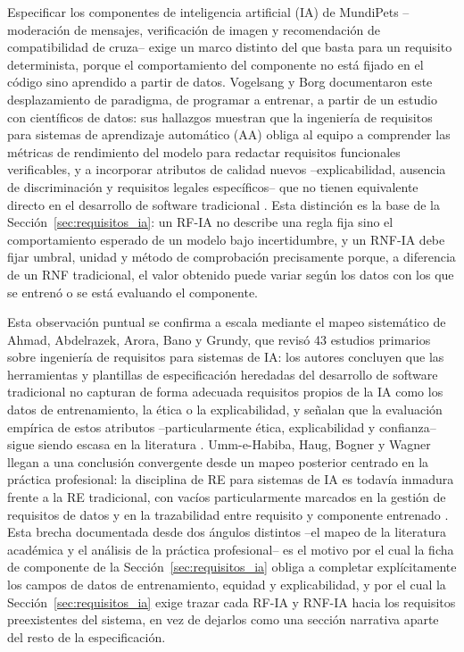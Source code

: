 \documentclass[journal,onecolumn]{IEEEtran}
\begin{document}
		Especificar los componentes de inteligencia artificial (IA) de MundiPets --moderación
	de mensajes, verificación de imagen y recomendación de compatibilidad de cruza-- exige un
	marco distinto del que basta para un requisito determinista, porque el comportamiento del
	componente no está fijado en el código sino aprendido a partir de datos. Vogelsang y Borg
	documentaron este desplazamiento de paradigma, de programar a entrenar, a partir de un
	estudio con científicos de datos: sus hallazgos muestran que la ingeniería de requisitos para
	sistemas de aprendizaje automático (AA) obliga al equipo a comprender las métricas de
	rendimiento del modelo para redactar requisitos funcionales verificables, y a incorporar
	atributos de calidad nuevos --explicabilidad, ausencia de discriminación y requisitos
	legales específicos-- que no tienen equivalente directo en el desarrollo de software
	tradicional \cite{vogelsang2019}. Esta distinción es la base de la Sección~\ref{sec:requisitos_ia}: un RF-IA no describe una regla fija sino el comportamiento esperado de un modelo bajo
	incertidumbre, y un RNF-IA debe fijar umbral, unidad y método de comprobación precisamente
	porque, a diferencia de un RNF tradicional, el valor obtenido puede variar según los datos con
	los que se entrenó o se está evaluando el componente.
	
	Esta observación puntual se confirma a escala mediante el mapeo sistemático de Ahmad, Abdelrazek,
	Arora, Bano y Grundy, que revisó 43 estudios primarios sobre ingeniería de requisitos para
	sistemas de IA: los autores concluyen que las herramientas y plantillas de especificación
	heredadas del desarrollo de software tradicional no capturan de forma adecuada requisitos
	propios de la IA como los datos de entrenamiento, la ética o la explicabilidad, y señalan que
	la evaluación empírica de estos atributos --particularmente ética, explicabilidad y
	confianza-- sigue siendo escasa en la literatura \cite{ahmad2023}. Umm-e-Habiba, Haug, Bogner
	y Wagner llegan a una conclusión convergente desde un mapeo posterior centrado en la práctica
	profesional: la disciplina de RE para sistemas de IA es todavía inmadura frente a la RE
	tradicional, con vacíos particularmente marcados en la gestión de requisitos de datos y en la
	trazabilidad entre requisito y componente entrenado \cite{Habiba2024}. Esta brecha documentada
	desde dos ángulos distintos --el mapeo de la literatura académica y el análisis de la práctica
	profesional-- es el motivo por el cual la ficha de componente de la Sección~\ref{sec:requisitos_ia}
	obliga a completar explícitamente los campos de datos de entrenamiento, equidad y
	explicabilidad, y por el cual la Sección~\ref{sec:requisitos_ia} exige trazar cada RF-IA y
	RNF-IA hacia los requisitos preexistentes del sistema, en vez de dejarlos como una sección
	narrativa aparte del resto de la especificación.
	
\end{document}
